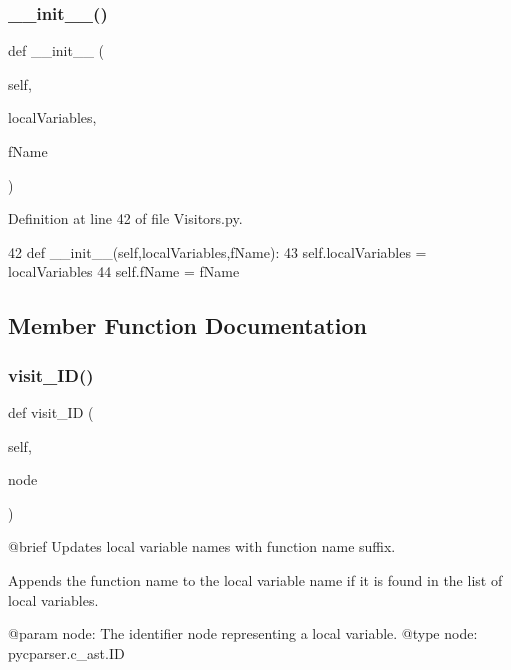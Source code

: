 \subsubsection{\texorpdfstring{\+\_\+\+\_\+init\+\_\+\+\_\+()}{\_\_init\_\_()}}
{\footnotesize\ttfamily def \+\_\+\+\_\+init\+\_\+\+\_\+ (\begin{DoxyParamCaption}\item[{}]{self,  }\item[{}]{local\+Variables,  }\item[{}]{f\+Name }\end{DoxyParamCaption})}



Definition at line 42 of file Visitors.\+py.


\begin{DoxyCode}
42     \textcolor{keyword}{def }\_\_init\_\_(self,localVariables,fName):
43         self.localVariables = localVariables
44         self.fName = fName
\end{DoxyCode}


\subsection{Member Function Documentation}
\mbox{\label{classVisitors_1_1LocalVariablesModifier_a876b22ca4502c2197e9881ebf8fb6288}} 
\subsubsection{\texorpdfstring{visit\+\_\+\+I\+D()}{visit\_ID()}}
{\footnotesize\ttfamily def visit\+\_\+\+ID (\begin{DoxyParamCaption}\item[{}]{self,  }\item[{}]{node }\end{DoxyParamCaption})}

\begin{DoxyVerb}@brief Updates local variable names with function name suffix.

Appends the function name to the local variable name if it is found in the list of local variables.

@param node: The identifier node representing a local variable.
@type node: pycparser.c_ast.ID
\end{DoxyVerb}
 

